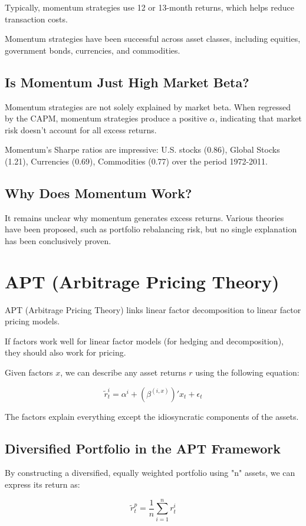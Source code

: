 \documentclass{article}
\begin{document}
Typically, momentum strategies use 12 or 13-month returns, which helps reduce transaction costs.

Momentum strategies have been successful across asset classes, including equities, government bonds, currencies, and commodities.

\subsection{Is Momentum Just High Market Beta?}
Momentum strategies are not solely explained by market beta. When regressed by the CAPM, momentum strategies produce a positive $\alpha$, indicating that market risk doesn’t account for all excess returns.

Momentum's Sharpe ratios are impressive: U.S. stocks (0.86), Global Stocks (1.21), Currencies (0.69), Commodities (0.77) over the period 1972-2011.

\subsection{Why Does Momentum Work?}
It remains unclear why momentum generates excess returns. Various theories have been proposed, such as portfolio rebalancing risk, but no single explanation has been conclusively proven.

\section{APT (Arbitrage Pricing Theory)}
APT (Arbitrage Pricing Theory) links linear factor decomposition to linear factor pricing models.

If factors work well for linear factor models (for hedging and decomposition), they should also work for pricing.

Given factors $x$, we can describe any asset returns $r$ using the following equation:

\[
\tilde{r}^{i}_t=\alpha^{i}+(\beta^{(i, x)})'x_t + \epsilon_t
\]

The factors explain everything except the idiosyncratic components of the assets.

\subsection{Diversified Portfolio in the APT Framework}
By constructing a diversified, equally weighted portfolio using "n" assets, we can express its return as:

\[
\tilde{r}^p_t = \frac{1}{n} \sum_{i=1}^{n} r^i_t
\]
\end{document}
